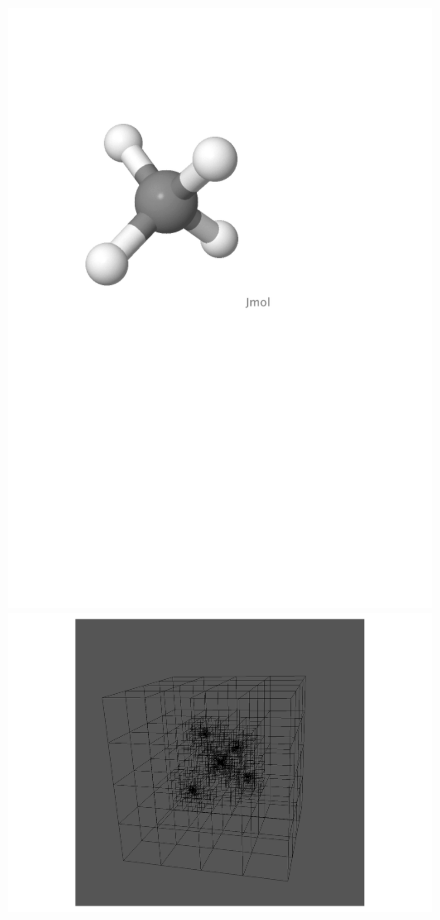 \begin{frame}
\begin{columns}
\begin{column}[b]{0.6\textwidth}
\begin{figure}
	\includegraphics[scale=0.2, clip, viewport = 100 450 400 720]{figures/methane.pdf}
	\includegraphics[scale=0.3, clip, viewport = 320 200 520 400]{figures/methaneGrid.pdf}

\end{figure}
\end{column}
\end{columns}
\end{frame}
